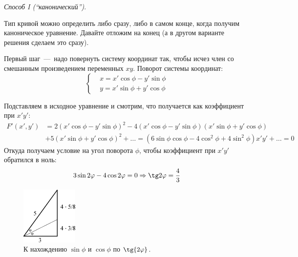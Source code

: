 \documentclass[a4paper,12pt]{article}
\begin{document}
  \begin{solution}
    \vphantom{}
  
    \emph{Способ I (``канонический'')}.
    
    Тип кривой можно определить либо сразу, либо в самом конце, когда получим каноническое уравнение.
    Давайте отложим на конец (а в другом варианте решения сделаем это сразу).
    
    Первый шаг~---~надо повернуть систему координат так, чтобы исчез член со смешанным произведением переменных $xy$.
    Поворот системы координат:
    \[
      \left\{
        \begin{aligned}
          &x = x' \cos \phi - y' \sin \phi\\
          &y = x' \sin \phi + y' \cos \phi
        \end{aligned}
      \right.
    \]
    
    Подставляем в исходное уравнение и смотрим, что получается как коэффициент при $x'y'$:
    \begin{equation*}
    \begin{split}
      F'(x', y') &= 2 (x' \cos \phi - y' \sin \phi)^2 - 4 (x' \cos \phi - y' \sin \phi) (x' \sin \phi + y' \cos \phi)\\
      &+ 5 (x' \sin \phi + y' \cos \phi)^2 + \ldots
      = (6 \sin\phi \cos\phi - 4 \cos^2 \phi + 4\sin^2 \phi)x' y' + \ldots = 0
    \end{split}
    \end{equation*}
    Откуда получаем условие на угол поворота $\phi$, чтобы коэффициент при $x'y'$ обратился в ноль:
    \[
       3 \sin 2\phi - 4 \cos 2\phi = 0 \Rightarrow \tg 2\phi = \frac{4}{3}
    \]
    
    \begin{figure}[h]
      \centering

      \includegraphics[width=0.25\textwidth]{triangle-9-4}
    
      \caption{К нахождению $\sin\phi$ и $\cos\phi$ по $\tg{2\phi}$.}
      \label{fig:triangle-9-4}
    \end{figure}
    

\end{solution}
\end{document}
